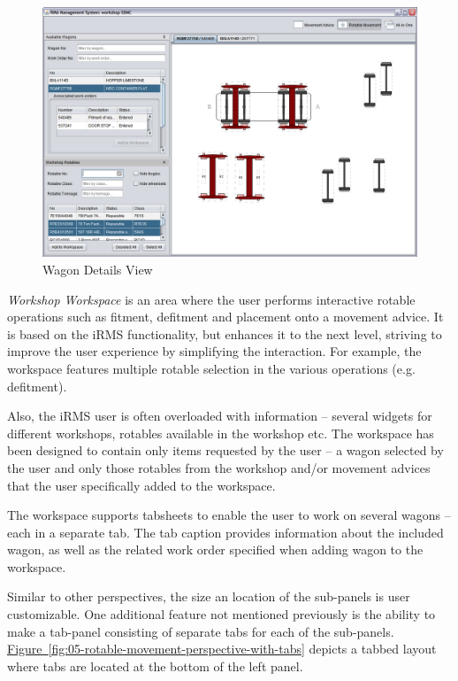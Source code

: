 \begin{figure}[!h]
\centering
\includegraphics[scale=0.37]{chapters/02-user-interface/images/04-rotable-movement-perspective-expanded.png}
\caption{Wagon Details View}\label{fig:04-rotable-movement-perspective-expanded}
\end{figure}

\emph{Workshop Workspace} is an area where the user performs interactive rotable operations such as fitment, defitment and placement onto a movement advice. It is based on the iRMS functionality, but enhances it to the next level, striving to improve the user experience by simplifying the interaction. For example, the workspace features multiple rotable selection in the various operations (e.g. defitment).

Also, the iRMS user is often overloaded with information -- several widgets for different workshops, rotables available in the workshop etc. The workspace has been designed to contain only items requested by the user -- a wagon selected by the user and only those rotables from the workshop and/or movement advices that the user specifically added to the workspace.

The workspace supports tabsheets to enable the user to work on several wagons -- each in a separate tab. The tab caption provides information about the included wagon, as well as the related work order specified when adding wagon to the workspace.

Similar to other perspectives, the size an location of the sub-panels is user customizable. One additional feature not mentioned previously is the ability to make a tab-panel consisting of separate tabs for each of the sub-panels. \hyperref[fig:05-rotable-movement-perspective-with-tabs.png]{Figure~\ref*{fig:05-rotable-movement-perspective-with-tabs}} depicts a tabbed layout where tabs are located at the bottom of the left panel.

